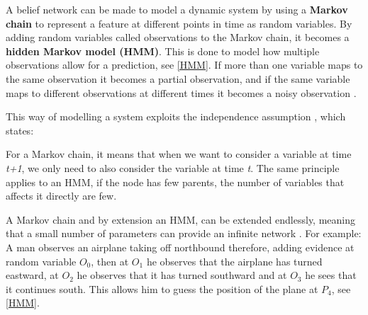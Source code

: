 A belief network can be made to model a dynamic system by using a \textbf{Markov
chain} to represent a feature at different points in time as random
variables. By adding random variables called observations to the
Markov chain, it becomes a \textbf{hidden Markov model (HMM)}. This is done to
model how multiple observations allow for a prediction, see \autoref{HMM}. If
more than one variable maps to the same observation it becomes a partial
observation, and if the same variable maps to different observations at
different times it becomes a noisy observation \citep[ch.6.5.2]{MIBook}.

This way of modelling a system exploits the independence assumption
\citep[p.240]{MIBook}, which states:
 
 \begin{center}
 \begin{minipage}{0.8\linewidth}
 \end{minipage}
 \end{center}
 
For a Markov chain, it means that when we want to consider a variable at time
\textit{t+1}, we only need to also consider the variable at time
\textit{t}. The same principle applies to an HMM, if the node has few parents,
the number of variables that affects it directly are few.\nl

A Markov chain and by extension an HMM, can be extended endlessly, meaning
that a small number of parameters can provide an infinite network
\citep[ch.6.5.1]{MIBook}. For example: A man observes an airplane taking off
northbound therefore, adding evidence at random variable $O_0$, then at $O_1$ he
observes that the airplane has turned eastward, at $O_2$ he observes that it
has turned southward and at $O_3$ he sees that it continues south. This allows
him to guess the position of the plane at $P_4$, see \autoref{HMM}. 





